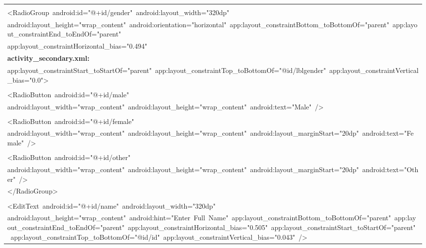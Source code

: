 \documentclass[a4paper,12pt]{article}
\begin{document}
\begin{longtable}{|p{}|}
\strut \\
{\ttfamily\small \textless{}RadioGroup\ android:id="@+id/gender"\ android:layout\_width="320dp"} \\
{\ttfamily\small android:layout\_height="wrap\_content"\ android:orientation="horizontal"\ app:layout\_constraintBottom\_toBottomOf="parent"\ app:layout\_constraintEnd\_toEndOf="parent"} \\
{\ttfamily\small app:layout\_constraintHorizontal\_bias="0.494"} \\
\hline
\rule{0pt}{13pt}\textbf{activity\_secondary.xml:} \\
\hline
{\ttfamily\small app:layout\_constraintStart\_toStartOf="parent"\ app:layout\_constraintTop\_toBottomOf="@id/lblgender"\ app:layout\_constraintVertical\_bias="0.0"\textgreater{}} \\
\strut \\
{\ttfamily\small \textless{}RadioButton\ android:id="@+id/male"} \\
{\ttfamily\small android:layout\_width="wrap\_content"\ android:layout\_height="wrap\_content"\ android:text="Male"\ /\textgreater{}} \\
\strut \\
{\ttfamily\small \textless{}RadioButton\ android:id="@+id/female"} \\
{\ttfamily\small android:layout\_width="wrap\_content"\ android:layout\_height="wrap\_content"\ android:layout\_marginStart="20dp"\ android:text="Female"\ /\textgreater{}} \\
\strut \\
{\ttfamily\small \textless{}RadioButton\ android:id="@+id/other"} \\
{\ttfamily\small android:layout\_width="wrap\_content"\ android:layout\_height="wrap\_content"\ android:layout\_marginStart="20dp"\ android:text="Other"\ /\textgreater{}} \\
{\ttfamily\small \textless{}/RadioGroup\textgreater{}} \\
\strut \\
{\ttfamily\small \textless{}EditText\ android:id="@+id/name"\ android:layout\_width="320dp"} \\
{\ttfamily\small android:layout\_height="wrap\_content"\ android:hint="Enter\ Full\ Name"\ app:layout\_constraintBottom\_toBottomOf="parent"\ app:layout\_constraintEnd\_toEndOf="parent"\ app:layout\_constraintHorizontal\_bias="0.505"\ app:layout\_constraintStart\_toStartOf="parent"\ app:layout\_constraintTop\_toBottomOf="@id/id"\ app:layout\_constraintVertical\_bias="0.043"\ /\textgreater{}} \\

\end{longtable}
\end{document}
